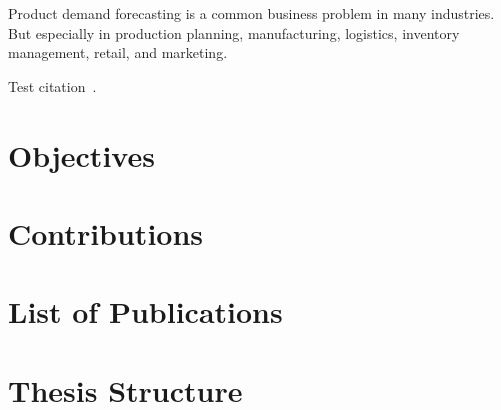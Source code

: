 


Product demand forecasting is a common business problem in many industries.
But especially in production planning, manufacturing, logistics, inventory management, retail, and marketing.

Test citation~\cite{ketkar2017introduction}.

\section[Objectives]{Objectives}




\section[Contributions]{Contributions}


\section[Publications]{List of Publications}

\section[Thesis Structure]{Thesis Structure}


